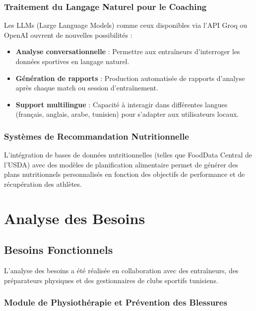\subsubsection{Traitement du Langage Naturel pour le Coaching}

Les LLMs (Large Language Models) comme ceux disponibles via l'API Groq ou OpenAI ouvrent de nouvelles possibilités :

\begin{itemize}
    \item \textbf{Analyse conversationnelle} : Permettre aux entraîneurs d'interroger les données sportives en langage naturel.
    \item \textbf{Génération de rapports} : Production automatisée de rapports d'analyse après chaque match ou session d'entraînement.
    \item \textbf{Support multilingue} : Capacité à interagir dans différentes langues (français, anglais, arabe, tunisien) pour s'adapter aux utilisateurs locaux.
\end{itemize}

\subsubsection{Systèmes de Recommandation Nutritionnelle}

L'intégration de bases de données nutritionnelles (telles que FoodData Central de l'USDA) avec des modèles de planification alimentaire permet de générer des plans nutritionnels personnalisés en fonction des objectifs de performance et de récupération des athlètes.

\section{Analyse des Besoins}

\subsection{Besoins Fonctionnels}

L'analyse des besoins a été réalisée en collaboration avec des entraîneurs, des préparateurs physiques et des gestionnaires de clubs sportifs tunisiens.

\subsubsection{Module de Physiothérapie et Prévention des Blessures}


